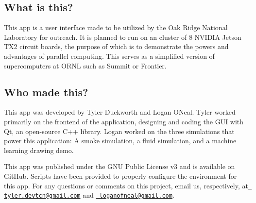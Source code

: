 \subsection*{What is this?}



This app is a user interface made to be utilized by the Oak Ridge National Laboratory for outreach. It is planned to run on an cluster of 8 N\+V\+I\+D\+IA Jetson T\+X2 circuit boards, the purpose of which is to demonstrate the powers and advantages of parallel computing. This serves as a simplified version of supercomputers at O\+R\+NL such as Summit or Frontier.

\subsection*{Who made this?}

This app was developed by Tyler Duckworth and Logan O\textquotesingle{}Neal. Tyler worked primarily on the frontend of the application, designing and coding the G\+UI with Qt, an open-\/source C++ library. Logan worked on the three simulations that power this application\+: A smoke simulation, a fluid simulation, and a machine learning drawing demo.

This app was published under the G\+NU Public License v3 and is available on Git\+Hub. Scripts have been provided to properly configure the environment for this app. For any questions or comments on this project, email us, respectively, at \href{mailto:tyler.devtcn@gmail.com}{\texttt{ tyler.\+devtcn@gmail.\+com}} and \href{mailto:loganofneal@gmail.com}{\texttt{ loganofneal@gmail.\+com}}. 